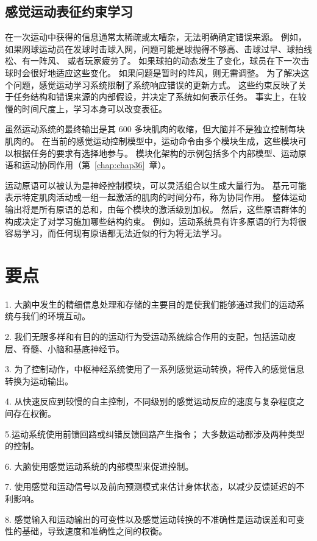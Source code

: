 \subsection{感觉运动表征约束学习}

在一次运动中获得的信息通常太稀疏或太嘈杂，无法明确确定错误来源。
例如，如果网球运动员在发球时击球入网，问题可能是球抛得不够高、击球过早、球拍线松、有一阵风、 或者玩家疲劳了。
如果球拍的动态发生了变化，球员在下一次击球时会很好地适应这些变化。
如果问题是暂时的阵风，则无需调整。
为了解决这个问题，感觉运动学习系统限制了系统响应错误的更新方式。
这些约束反映了关于任务结构和错误来源的内部假设，并决定了系统如何表示任务。
事实上，在较慢的时间尺度上，学习本身可以改变表征。


虽然运动系统的最终输出是其 600 多块肌肉的收缩，但大脑并不是独立控制每块肌肉的。
在当前的感觉运动控制模型中，运动命令由多个模块生成，这些模块可以根据任务的要求有选择地参与。
模块化架构的示例包括多个内部模型、运动原语和运动协同作用（第~\ref{chap:chap36}~章）。


运动原语可以被认为是神经控制模块，可以灵活组合以生成大量行为。
基元可能表示特定肌肉活动或一组一起激活的肌肉的时间分布，称为协同作用。
整体运动输出将是所有原语的总和，由每个模块的激活级别加权。
然后，这些原语群体的构成决定了对学习施加哪些结构约束。
例如，运动系统具有许多原语的行为将很容易学习，而任何现有原语都无法近似的行为将无法学习。



\section{要点}

1. 大脑中发生的精细信息处理和存储的主要目的是使我们能够通过我们的运动系统与我们的环境互动。


2. 我们无限多样和有目的的运动行为受运动系统综合作用的支配，包括运动皮层、脊髓、小脑和基底神经节。


3. 为了控制动作，中枢神经系统使用了一系列感觉运动转换，将传入的感觉信息转换为运动输出。


4. 从快速反应到较慢的自主控制，不同级别的感觉运动反应的速度与复杂程度之间存在权衡。


5.运动系统使用前馈回路或纠错反馈回路产生指令；
大多数运动都涉及两种类型的控制。


6. 大脑使用感觉运动系统的内部模型来促进控制。


7. 使用感觉和运动信号以及前向预测模式来估计身体状态，以减少反馈延迟的不利影响。


8. 感觉输入和运动输出的可变性以及感觉运动转换的不准确性是运动误差和可变性的基础，导致速度和准确性之间的权衡。


